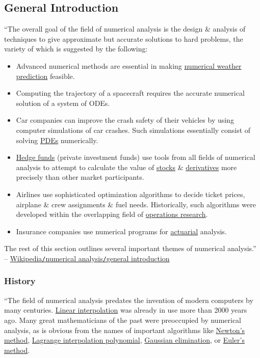 \documentclass[oneside]{book}
\numberwithin{equation}{section}
\begin{document}
\subsection{General Introduction}
``The overall goal of the field of numerical analysis is the design \& analysis of techniques to give approximate but accurate solutions to hard problems, the variety of which is suggested by the following:
\begin{itemize}
	\item Advanced numerical methods are essential in making \href{https://en.wikipedia.org/wiki/Numerical_weather_prediction}{numerical weather prediction} feasible.
	\item Computing the trajectory of a spacecraft requires the accurate numerical solution of a system of ODEs.
	\item Car companies can improve the crash safety of their vehicles by using computer simulations of car crashes. Such simulations essentially consist of solving \href{https://en.wikipedia.org/wiki/Partial_differential_equation}{PDEs} numerically.
	\item \href{https://en.wikipedia.org/wiki/Hedge_fund}{Hedge funds} (private investment funds) use tools from all fields of numerical analysis to attempt to calculate the value of \href{https://en.wikipedia.org/wiki/Stock}{stocks} \& \href{https://en.wikipedia.org/wiki/Derivative_(finance)}{derivatives} more precisely than other market participants.
	\item Airlines use sophisticated optimization algorithms to decide ticket prices, airplane \& crew assignments \& fuel needs. Historically, such algorithms were developed within the overlapping field of \href{https://en.wikipedia.org/wiki/Operations_research}{operations research}.
	\item Insurance companies use numerical programs for \href{https://en.wikipedia.org/wiki/Actuary}{actuarial} analysis.
\end{itemize}
The rest of this section outlines several important themes of numerical analysis.'' -- \href{https://en.wikipedia.org/wiki/Numerical_analysis#General_introduction}{Wikipedia\texttt{/}numerical analysis\texttt{/}general introduction}

\subsubsection{History}
``The field of numerical analysis predates the invention of modern computers by many centuries. \href{https://en.wikipedia.org/wiki/Linear_interpolation}{Linear interpolation} was already in use more than 2000 years ago. Many great mathematicians of the past were preoccupied by numerical analysis, as is obvious from the names of important algorithms like \href{https://en.wikipedia.org/wiki/Newton%27s_method}{Newton's method}, \href{https://en.wikipedia.org/wiki/Lagrange_polynomial}{Lagrange interpolation polynomial}, \href{https://en.wikipedia.org/wiki/Gaussian_elimination}{Gaussian elimination}, or \href{https://en.wikipedia.org/wiki/Euler%27s_method}{Euler's method}.
\end{document}
